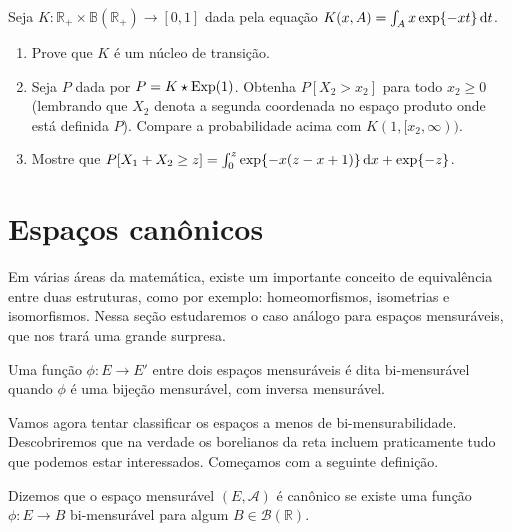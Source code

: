 \begin{exercise}
  Seja $K:\mathbb{R}_+ \times \mathbb{B}(\mathbb{R}_+) \to [0,1]$ dada pela equação $K(x,A) = \int_A x \exp\{-x t\} \mathop{}\!\mathrm{d} t$.
  \begin{enumerate}[\quad a)]
  \item Prove que $K$ \'e um n\'ucleo de transi\c{c}\~ao.
  \item Seja $P$ dada por $P = K \star \textnormal{Exp}(1)$.
    Obtenha $P[X_2 > x_2]$ para todo $x_2 \geq 0$ (lembrando que $X_2$ denota a segunda coordenada no espa\c{c}o produto onde est\'a definida $P$).
    Compare a probabilidade acima com $K(1,[x_2, \infty))$.
  \item Mostre que $P[X_1 + X_2 \geq z] = \int_0^z \exp \{-x(z-x+1)\} \mathop{}\!\mathrm{d} x + \exp\{-z\}$.
  \end{enumerate}
\end{exercise}

\vfill
\pagebreak

\section{Espaços canônicos}

Em várias áreas da matemática, existe um importante conceito de equivalência entre duas estruturas, como por exemplo: homeomorfismos, isometrias e isomorfismos.
Nessa seção estudaremos o caso análogo para espaços mensuráveis, que nos trará uma grande surpresa.

\begin{definition}
  Uma função $\phi:E \to E'$ entre dois espaços mensuráveis é dita bi-mensurável  quando $\phi$ é uma bijeção mensurável, com inversa mensurável.
\end{definition}

Vamos agora tentar classificar os espaços a menos de bi-mensurabilidade.
Descobriremos que na verdade os borelianos da reta incluem praticamente tudo que podemos estar interessados.
Começamos com a seguinte definição.

\begin{definition}
  Dizemos que o espaço mensurável $(E, \mathcal{A})$ é canônico  se existe uma função $\phi: E \to B$ bi-mensurável para algum $B \in \mathcal{B}(\mathbb{R})$.
\end{definition}

